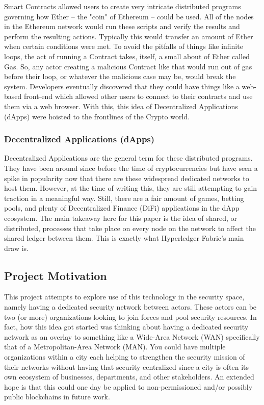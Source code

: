 			\hspace{10mm}Smart Contracts allowed users to create very intricate distributed programs governing how Ether -- the "coin" of Ethereum -- could be used. All of the nodes in the Ethereum network would run these scripts and verify the results and perform the resulting actions. Typically this would transfer an amount of Ether when certain conditions were met. To avoid the pitfalls of things like infinite loops, the act of running a Contract takes, itself, a small about of Ether called Gas. So, any actor creating a malicious Contract like that would run out of gas before their loop, or whatever the malicious case may be, would break the system. Developers eventually discovered that they could have things like a web-based front-end which allowed other users to connect to their contracts and use them via a web browser. With this, this idea of Decentralized Applications (dApps) were hoisted to the frontlines of the Crypto world. 
			
		\subsubsection{Decentralized Applications (dApps)}
			\hspace{10mm}Decentralized Applications are the general term for these distributed programs. They have been around since before the time of cryptocurrencies but have seen a spike in popularity now that there are these widespread dedicated networks to host them. However, at the time of writing this, they are still attempting to gain traction in a meaningful way. Still, there are a fair amount of games, betting pools, and plenty of Decentralized Finance (DiFi) applications in the dApp ecosystem. The main takeaway here for this paper is the idea of shared, or distributed, processes that take place on every node on the network to affect the shared ledger between them. This is exactly what Hyperledger Fabric's main draw is.
	
	\subsection{Project Motivation}
		\hspace{10mm}This project attempts to explore use of this technology in the security space, namely having a dedicated security network between actors. These actors can be two (or more) organizations looking to join forces and pool security resources. In fact, how this idea got started was thinking about having a dedicated security network as an overlay to something like a Wide-Area Network (WAN) specifically that of a Metropolitan-Area Network (MAN). You could have multiple organizations within a city each helping to strengthen the security mission of their networks without having that security centralized since a city is often its own ecosystem of businesses, departments, and other stakeholders. An extended hope is that this could one day be applied to non-permissioned and/or possibly public blockchains in future work.\\
	
